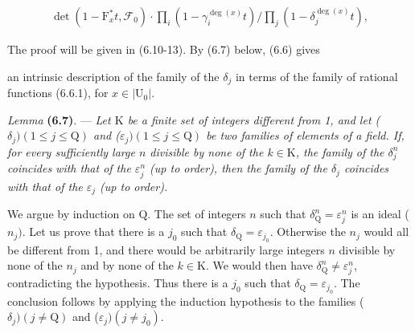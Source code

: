 \documentclass[10pt,leqno]{article}
\begin{document}
\begin{equation*}\begin{gathered}\operatorname{det}(1- \mathrm{F}_{x}^{*}t,\mathcal{F} _{0})\cdot \prod _{i}(1- \gamma _{i}^{\operatorname{deg}(x)}t) / \prod _{j}(1- \delta _{j}^{\operatorname{deg}(x)}t),\end{gathered}\tag{6.6.1}\end{equation*}

\par

\noindent The proof will be given in (6.10-13). By (6.7) below, (6.6) gives\par

\clearpage

\label{physical-26}\par\smallskip

\noindent an intrinsic description of the family of the \(\delta _{j}\) in terms of the family of rational functions (6.6.1), for \(x\in |\mathrm{U}_{0}|\).\par

\noindent \emph{Lemma} \textbf{(6.7)}. — {\itshape Let \(\mathrm{K}\) be a finite set of integers different from 1, and let (\(\delta _{j}) (1\leq j\leq \mathrm{Q})\) and (\(\varepsilon _{j}) (1\leq j\leq \mathrm{Q})\) be two families of elements of a field. If, for every sufficiently large \(n\) divisible by none of the \(k\in \mathrm{K}\), the family of the \(\delta _{j}^{n}\) coincides with that of the \(\varepsilon _{j}^{n}\) (up to order), then the family of the \(\delta _{j}\) coincides with that of the \(\varepsilon _{j}\) (up to order).}\par

\noindent We argue by induction on \(\mathrm{Q}\). The set of integers \(n\) such that \(\delta _{\mathrm{Q}}^{n}=\varepsilon _{j}^{n}\) is an ideal (\(n_{j})\). Let us prove that there is a \(j_{0}\) such that \(\delta _{\mathrm{Q}}=\varepsilon _{j_{0}}\). Otherwise the \(n_{j}\) would all be different from 1, and there would be arbitrarily large integers \(n\) divisible by none of the \(n_{j}\) and by none of the \(k\in \mathrm{K}\). We would then have \(\delta _{\mathrm{Q}}^{n}\ne \varepsilon _{j}^{n}\), contradicting the hypothesis. Thus there is a \(j_{0}\) such that \(\delta _{\mathrm{Q}}=\varepsilon _{j_{0}}\). The conclusion follows by applying the induction hypothesis to the families (\(\delta _{j}) (j\ne \mathrm{Q})\) and (\(\varepsilon _{j}) (j\ne j_{0})\).\par
\end{document}

